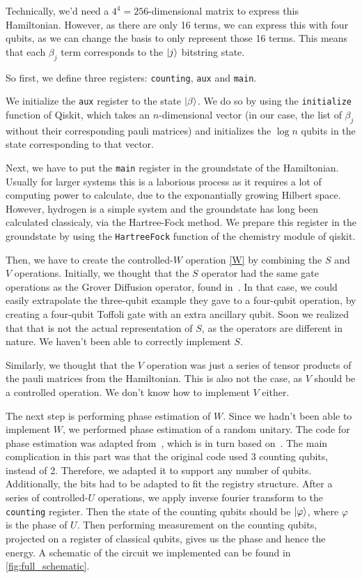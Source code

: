 \documentclass{article}
\begin{document}
Technically, we'd need a $4^4 = 256$-dimensional matrix to express this Hamiltonian. However, as there are only 16 terms, we can express this with four qubits, as we can change the basis to only represent those 16 terms.  This means that each $\beta_j$ term corresponds to the $\ket{j}$ bitstring state.

So first, we define three registers:  \verb|counting|, \verb|aux| and \verb|main|.

We initialize the \verb|aux| register to the state $\ket{\beta}$. We do so by using the \verb|initialize| function of Qiskit, which takes an $n$-dimensional vector (in our case, the list of $\beta_j$ without their corresponding pauli matrices) and initializes the $\log{n}$  qubits in the state corresponding to that vector.

Next, we have to put the \verb|main| register in the groundstate of the Hamiltonian. Usually for larger systems this is a laborious process as it requires a lot of computing power to calculate, due to the exponantially growing Hilbert space. However, hydrogen is a simple system and the groundstate has long been calculated classicaly, via the Hartree-Fock method. We prepare this register in the groundstate by using the \verb|HartreeFock| function of the chemistry module of qiskit.

Then, we have to create the controlled-$W$ operation \cref{W} by combining the $S$ and $V$ operations. Initially, we thought that the $S$ operator had the same gate operations as the Grover Diffusion operator, found in~\cite{Qiskit-Textbook}. In that case, we could easily extrapolate the three-qubit example they gave to a four-qubit operation, by creating a four-qubit Toffoli gate with an extra ancillary qubit. Soon we realized that that is not the actual representation of $S$, as the operators are different in nature. We haven't been able to correctly implement $S$.

Similarly, we thought that the $V$ operation was just a series of tensor products of the pauli matrices from the Hamiltonian. This is also not the case, as $V$ should be a controlled operation. We don't know how to implement $V$ either.

The next step is performing phase estimation of $W$. Since we hadn't been able to implement $W$, we performed phase estimation of a random unitary. The code for phase estimation was adapted from~\cite{Qiskit-Textbook}, which is in turn based on~\textcite{nielsen}. The main complication in this part was that the original code used 3 counting qubits, instead of 2. Therefore, we adapted it to support any number of qubits. Additionally, the bits had to be adapted to fit the registry structure. After a series of controlled-$U$ operations, we apply inverse fourier transform to the \verb|counting| register. Then the state of the counting qubits should be $\ket{\varphi}$, where $\varphi$ is the phase of $U$. Then performing measurement on the counting qubits, projected on a register of classical qubits, gives us the phase and hence the energy. A schematic of the circuit we implemented can be found in \cref{fig:full_schematic}.
\end{document}
